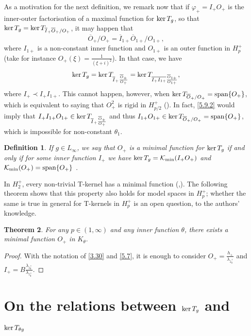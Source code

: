 \documentclass[11pt]{article}
\def\ker{\mathop{\rm ker}\nolimits}
\renewcommand\span{\mathop{\rm span}\nolimits}
\def\spam{\span} %
\renewcommand\phi{\varphi}
\newtheorem{thm}{Theorem}[section]
\newtheorem{defn}[thm]{Definition}
\numberwithin{equation}{section}
\def\beginpf{\begin{proof}}
\def\endpf{\end{proof}}
\def\beq{\begin{equation}}
\def\eeq{\end{equation}}
\begin{document}
As a motivation for the next definition, we remark now that if $\phi_+=I_+O_+$ is the inner-outer factorisation of a maximal function for $\ker T_g$, so that $\ker T_g=\ker T_{\overline{I}_+\overline{O}_+/O_+}$, it may happen that
\beq \label{5.9.1}
\overline{O}_+/O_+=\overline{I}_{1+}\overline{O}_{1+}/O_{1+},
\eeq
where $I_{1+}$ is a non-constant inner function and $O_{1+}$ is an outer function in $H_p^+$ (take for instance $O_+(\xi)=\frac{1}{(\xi+i)^2}$). In that case, we have
\beq \label{5.9.2}
\ker T_g=\ker T_{\overline{I}_+\frac{\overline{O}_+}{O_+}}=\ker T_{\overline{I_+I_{1+}}\frac{\overline{O}_{1+}}{O_{1+}}},
\eeq
where $I_+ \prec I_+ I_{1+}$. This cannot happen, however, when $\ker T_{\overline{O}_+/O_+}=\spam \{O_+\}$, which is equivalent to saying that $O_{+}^2$ is rigid in $H^+_{p/2}$ (\cite{CP14}). In fact, \eqref{5.9.2} would imply  that
$I_+I_{1+}O_{1+}\in  \ker T_{\overline{I}_+\frac{\overline{O}_+}{O_+}}$ and thus $I_{1+}O_{1+}\in \ker T_{\overline O_+/O_+}=\spam \{O_+\}$, which is impossible for non-constant $\theta_1$.\\


\begin{defn}\label{defn:5.4}
If $g \in L_\infty$, we say that $O_+$ is a \emph{minimal function} for $\ker T_g$ if and only if  for some inner function $I_+$ we have $\ker T_g=\mathcal{K}_{\min}(I_+O_+)$ and $\mathcal{K}_{\min}(O_+)=\spam \{O_+\}$ .\\
\end{defn}

In $H_2^+$, every non-trivial T-kernel has a minimal function (\cite{sarason88},\cite{sarason}). The following theorem shows that this property also holds for model spaces in $H_p^+$; whether the same is true in general for T-kernels in $H_p^+$ is an open question, to the authors' knowledge.

\begin{thm}\label{thm:5.5}
For any $p\in (1,\infty)$ and any inner function $\theta$, there exists a minimal function $O_+$ in $K_\theta$.
\end{thm}
\beginpf
With the notation of \eqref{3.30} and \eqref{5.7}, it is enough to consider $O_+=\frac{h_+}{\lambda_{\overline{z}_0^+}}$ and $I_+=B\frac{\lambda_{\overline{z}_0^+}}{\lambda_{z_0^+}}$.
\endpf


\section{On the relations between $\ker T_g$ and $\ker T_{\theta g}$}
\label{sec:6}
\end{document}
